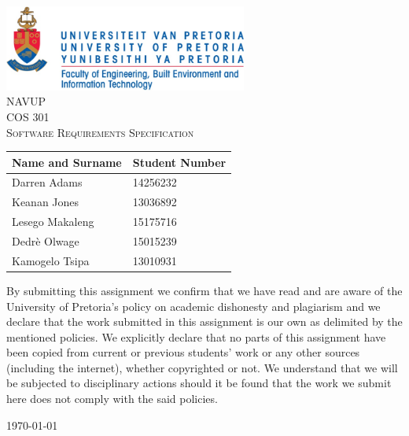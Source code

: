 \begin{titlepage}
	\begin{center}
	
		\includegraphics[width=0.6\textwidth]{./up_logo_doc.jpg}\\[2.0cm]    
	
		\textsc{\LARGE NAVUP}\\[1.0cm]
	
		\textsc{\Large COS 301}\\[0.75cm]

		\textsc{\Large Software Requirements Specification}\\[1.0cm]
		
        \date{February 2017}

        
        \begingroup
			\setlength{\tabcolsep}{10pt} 
			\renewcommand{\arraystretch}{1.5}
			\centering
			\begin{tabular}{|p{6cm}|p{6cm}|}
				\hline
				\multicolumn{1}{|c|}{\textbf{Name and Surname}}		&
				\multicolumn{1}{c|}{\textbf{Student Number}} 		\\
				\hline
				Darren Adams	& 14256232  \\
				\hline
				Keanan Jones	& 13036892  \\
				\hline
				Lesego Makaleng	& 15175716  \\
                \hline
				Dedrè Olwage	& 15015239  \\
                \hline
				Kamogelo Tsipa	& 13010931  \\
				\hline
			\end{tabular}
		
	\end{center}
\endgroup
	\noindent By submitting this assignment we confirm that we have read and are aware of the University of Pretoria's policy on academic dishonesty and plagiarism and we declare that the work submitted in this assignment is our own as delimited by the mentioned policies. We explicitly declare that no parts of this assignment have been copied from current or previous students' work or any other sources (including the internet), whether copyrighted or not. We understand that we will be subjected to disciplinary actions should it be found that the work we submit here does not comply with the said policies.

	\begin{center}

		\vfill

		{\large \today}
		
	\end{center}
	
\end{titlepage}
